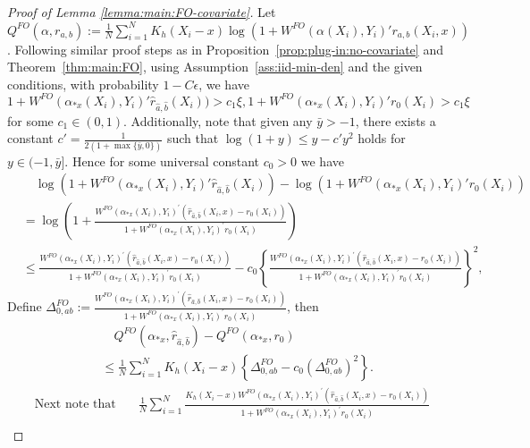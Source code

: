 \documentclass[11pt]{article}
\begin{document}
\begin{proof}[Proof of Lemma \ref{lemma:main:FO-covariate}]
Let $Q^{FO}(\alpha,r_{a,b}):= \frac{1}{N}\sum_{i=1}^N K_h(X_i-x)\log(1+ W^{FO}(\alpha(X_i),Y_i)'r_{a,b}(X_i,x))$. 
Following similar proof steps as in Proposition~\ref{prop:plug-in:no-covariate} and Theorem~\ref{thm:main:FO}, using Assumption~\ref{ass:iid-min-den} and the given conditions, with probability $1-C\epsilon$, we have 
$$1 +  W^{FO}(\alpha_{*x}(X_i),Y_i)'\hat r_{\hat a,\hat b}(X_i))>c_1\xi, 1 + W^{FO}(\alpha_{*x}(X_i),Y_i)' r_0(X_i)>c_1\xi$$ 
for some $c_1\in(0,1)$. Additionally, note that given any $\bar{y}>-1$, there exists a constant $c'=\frac{1}{2(1+\max\{\bar{y},0\})}$ such that $\log(1+y)\leq y-c'y^2$ holds for $y\in(-1,\bar{y}]$. Hence for some universal constant $c_0>0$ we have 
$$\begin{array}{rl}
       &\displaystyle\quad \log ( 1 +  W^{FO}(\alpha_{*x}(X_i),Y_i)'\hat r_{\hat a,\hat b}(X_i))   -\log( 1 + W^{FO}(\alpha_{*x}(X_i),Y_i)' r_0(X_i)) \\
       &\displaystyle=\log\left(1+\frac{ W^{FO}(\alpha_{*x}(X_i),Y_i)^\prime(\hat{r}_{\hat a,\hat b}(X_i,x)-r_0(X_i))}{1+ W^{FO}(\alpha_{*x}(X_i),Y_i)^\prime r_0(X_i)}\right)\\
       &\displaystyle\leq\frac{ W^{FO}(\alpha_{*x}(X_i),Y_i)^\prime(\hat{r}_{\hat a,\hat b}(X_i,x)-r_0(X_i))}{1+W^{FO}(\alpha_{*x}(X_i),Y_i)^\prime r_0(X_i)}-c_0\left\{\frac{W^{FO}(\alpha_{*x}(X_i),Y_i)^\prime(\hat{r}_{\hat a,\hat b}(X_i,x)-r_0(X_i))}{1+W^{FO}(\alpha_{*x}(X_i),Y_i)^\prime r_0(X_i)}\right\}^2,
\end{array}$$
Define $\Delta_{0,ab}^{FO}:=\frac{W^{FO}(\alpha_{*x}(X_i),Y_i)^\prime(\hat{r}_{\hat a, \hat b}(X_i,x)-r_0(X_i))}{1+W^{FO}(\alpha_{*x}(X_i),Y_i)^\prime r_0(X_i)}$, then 
\begin{equation}\label{eq:covariate:quadratic:Q}
\begin{array}{rl} 
&\quad \displaystyle Q^{FO}(\alpha_{*x},\hat r_{\hat a,\hat b})-Q^{FO}(\alpha_{*x}, r_0)  \\
&\displaystyle \leq \frac{1}{N}\sum_{i=1}^N K_h(X_i-x)\left\{\Delta_{0,ab}^{FO}-c_0(\Delta_{0,ab}^{FO})^2\right\}.
\end{array}
\end{equation}
$$\begin{array}{rl}
\mbox{Next note that}&\displaystyle\quad \frac{1}{N}\sum_{i=1}^N \frac{K_h(X_i-x)W^{FO}(\alpha_{*x}(X_i),Y_i)^\prime(\hat{r}_{\hat a,\hat b}(X_i,x)-r_0(X_i))}{1+W^{FO}(\alpha_{*x}(X_i),Y_i)^\prime r_0(X_i)} \\

\end{array}$$
\end{proof}
\end{document}
